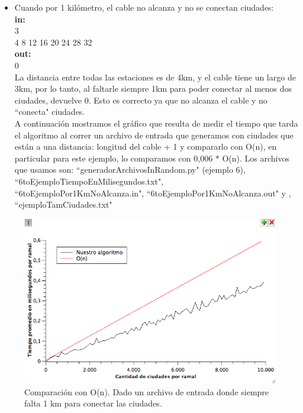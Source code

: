 \begin{itemize}
\item Cuando por 1 kilómetro, el cable no alcanza y no se conectan ciudades:\\
\textbf{in:}\\ 
3\\
4 8 12 16 20 24 28 32 \\
\textbf{out:}\\
0\\

La distancia entre todas las estaciones es de 4km, y el cable tiene un largo de 3km, por lo tanto, al faltarle siempre 1km para poder conectar al menos dos ciudades, devuelve 0. Esto es correcto ya que no alcanza el cable y no ``conecta" ciudades. \\

A continuación mostramos el gráfico que resulta de medir el tiempo que tarda el algoritmo al correr un archivo de entrada que generamos con ciudades que están a una distancia: longitud del cable + 1 y compararlo con O(n), en particular para este ejemplo, lo comparamos con 0,006 $*$ O(n). Los archivos que usamos son: ``generadorArchivosInRandom.py" (ejemplo 6), ``6toEjemploTiempoEnMilisegundos.txt", \\ ``6toEjemploPor1KmNoAlcanza.in", ``6toEjemploPor1KmNoAlcanza.out" y , ``ejemploTamCiudades.txt"\\

\end{itemize}

\begin{figure}[H]
\begin{center}

  \includegraphics[width=\linewidth]{../graficos/ej1/falta1KmSiempre.png}
  \caption{{\small Comparación con O(n). Dado un archivo de entrada donde siempre falta 1 km para conectar las ciudades.}} \label{ej1-tiempo-vs-falta-1-km-siempre}
\endminipage

\end{center}
\end{figure}

